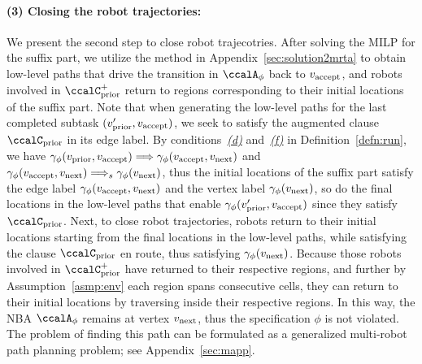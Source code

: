 \documentclass[Afour,sageh,times]{sagej}
\newcommand{\autop}{\ccalA_{\phi}}
\newcommand{\vertex}[1]{v_{\textup{#1}}}
\newcommand{\simplies}{\DOTSB\Longrightarrow}
\begin{document}
{{\paragraph{(3) Closing the robot trajectories:}\label{sec:closing}
We present the second step to close robot trajecotries.  After solving the MILP for the suffix part, we utilize the method in  Appendix~\ref{sec:solution2mrta} to obtain low-level paths that drive the transition in $\autop$ back to $\vertex{accept}$, and robots involved in $\ccalC_{\text{prior}}^+$ return to regions corresponding to their initial locations of the suffix part. Note that when generating the low-level paths for the last completed subtask $(\vertex{prior}', \vertex{accept})$, we seek to satisfy  the augmented  clause $\ccalC_{\text{prior}}$  in its edge label. By conditions~\hyperref[cond:d]{\it (d)} and~\hyperref[cond:f]{\it (f)} in Definition~\ref{defn:run}, we have $\gamma_\phi(\vertex{prior}, \vertex{accept}) \simplies \gamma_\phi(\vertex{accept}, \vertex{next})$ and $\gamma_\phi(\vertex{accept}, \vertex{next}) \simplies_s \gamma_\phi(\vertex{next})$, thus the initial locations of the suffix part satisfy the edge label $\gamma_\phi(\vertex{accept}, \vertex{next})$ and the  vertex label $\gamma_\phi(\vertex{next})$, so do the final locations in the low-level paths that enable $\gamma_\phi(\vertex{prior}', \vertex{accept})$ since they satisfy $\ccalC_{\text{prior}}$. Next, to close robot trajectories, robots return to their initial locations starting from the final locations in the low-level paths, while satisfying the clause $\ccalC_{\text{prior}}$ en route, thus satisfying $\gamma_{\phi}(\vertex{next})$. Because those robots involved in $\ccalC_{\text{prior}}^+$ have returned to their respective regions, and further by Assumption~\ref{asmp:env} each region spans consecutive cells,  they can return to their initial locations by traversing inside their respective regions. In this way, the NBA $\autop$ remains at vertex $\vertex{next}$, thus the specification $\phi$ is not violated. The problem of finding this path can be formulated as a generalized multi-robot path planning problem; see Appendix~\ref{sec:mapp}.

}}
\end{document}
